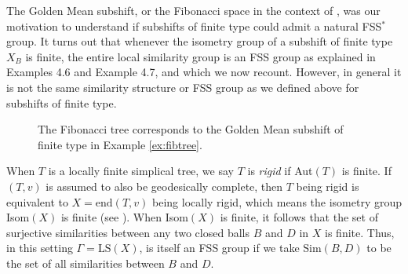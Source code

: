 \documentclass[12pt]{amsart}
\numberwithin{equation}{subsection}
\theoremstyle{definition}
\theoremstyle{definition}
\theoremstyle{remark}
\begin{document}
The Golden Mean subshift, or the Fibonacci space in the context of \cite{hughes2012treesnoncomm}, was our motivation to understand if subshifts of finite type could admit a natural FSS$^*$ group. It turns out that whenever the isometry group of a subshift of finite type $X_B$ is finite, the entire local similarity group is an FSS group as explained in \cite{hughes2009} Examples 4.6 and Example 4.7, and which we now recount. However, in general it is not the same similarity structure or FSS group as we defined above for subshifts of finite type. 

\begin{figure}
\centering
{}

\caption[The Fibonacci tree corresponding to the Golden Mean subshift of finite type.]{The Fibonacci tree corresponds to the Golden Mean subshift of finite type in Example \ref{ex:fibtree}.}
\label{fig:FibTree}
\end{figure}


When $T$ is a locally finite simplical tree, we say $T$ is \emph{rigid} if Aut$(T)$ is finite. If $(T,v)$ is assumed to also be geodesically complete, then $T$ being rigid is equivalent to $X = \text{end}(T,v)$ being locally rigid, which means the isometry group Isom$(X)$ is finite (see \cite{hughes2012treesnoncomm}). When Isom$(X)$ is finite, it follows that the set of surjective similarities between any two closed balls $B$ and $D$ in $X$ is finite. Thus, in this setting $\Gamma = \text{LS}(X)$, is itself an FSS group if we take  $\text{Sim}(B,D)$ to be the set of all similarities between $B$ and $D$. 
\end{document}
